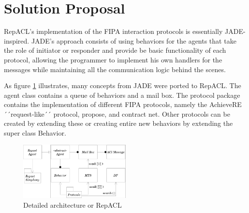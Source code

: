 \section{Solution Proposal} %
\label{sec:proposal}

RepACL's implementation of the FIPA interaction protocols is essentially JADE-inspired. JADE's approach consists of using behaviors for the agents that take the role of initiator or responder and provide be basic functionality of each protocol, allowing the programmer to implement his own handlers for the messages while maintaining all the communication logic behind the scenes.

As figure \ref{fig:arch} illustrates, many concepts from JADE were ported to RepACL. The agent class contains a queue of behaviors and a mail box. The protocol package contains the implementation of different FIPA protocols, namely the AchieveRE ´´request-like´´ protocol, propose, and contract net. Other protocols can be created by extending these or creating entire new behaviors by extending the super class Behavior.

\begin{figure}[h]
	\centering
	\includegraphics[width=0.5\textwidth]{figures/repacl_arch.png}
	\caption{Detailed architecture or RepACL}
	\label{fig:arch}
\end{figure}

